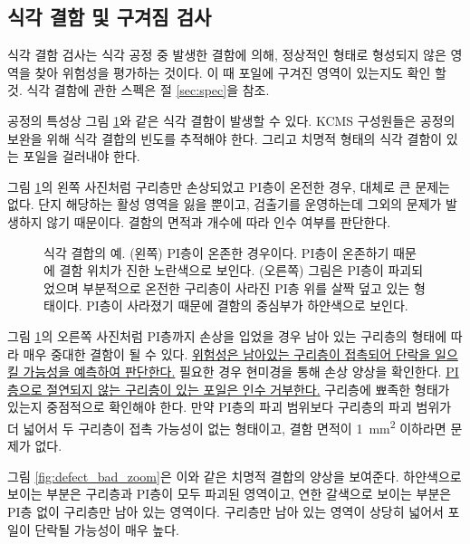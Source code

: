 \subsection{식각 결함 및 구겨짐 검사}
식각 결함 검사는 식각 공정 중 발생한 결함에 의해, 정상적인 형태로 형성되지 않은 영역을 찾아 위험성을 평가하는 것이다. 이 때 포일에 구겨진 영역이 있는지도 확인 할 것. 식각 결함에 관한 스펙은 절 \ref{sec:spec}을 참조.

공정의 특성상 그림 \ref{fig:example_defect}와 같은 식각 결함이 발생할 수 있다. KCMS 구성원들은 공정의 보완을 위해 식각 결합의 빈도를 추적해야 한다. 그리고 치명적 형태의 식각 결함이 있는 포일을 걸러내야 한다. 

그림 \ref{fig:example_defect}의 왼쪽 사진처럼 구리층만 손상되었고 PI층이 온전한 경우, 대체로 큰 문제는 없다. 단지 해당하는 활성 영역을 잃을 뿐이고, 검출기를 운영하는데 그외의 문제가 발생하지 않기 때문이다. 결함의 면적과 개수에 따라 인수 여부를 판단한다.

\begin{figure}[htb]
  \centering
  \caption[식각 결합의 예]{식각 결합의 예. (왼쪽) PI층이 온존한 경우이다. PI층이 온존하기 때문에 결함 위치가 진한 노란색으로 보인다. (오른쪽) 그림은 PI층이 파괴되었으며 부분적으로 온전한 구리층이 사라진 PI층 위를 살짝 덮고 있는 형태이다. PI층이 사라졌기 때문에 결함의 중심부가 하얀색으로 보인다.}
  \label{fig:example_defect}
\end{figure}

그림 \ref{fig:example_defect}의 오른쪽 사진처럼 PI층까지 손상을 입었을 경우 남아 있는 구리층의 형태에 따라 매우 중대한 결함이 될 수 있다. \uline{위험성은 남아있는 구리층이 접촉되어 단락을 일으킬 가능성을 예측하여 판단한다.} 필요한 경우 현미경을 통해 손상 양상을 확인한다. \uline{PI층으로 절연되지 않는 구리층이 있는 포일은 인수 거부한다.} 구리층에 뾰족한 형태가 있는지 중점적으로 확인해야 한다. 만약 PI층의 파괴 범위보다 구리층의 파괴 범위가 더 넓어서 두 구리층이 접촉 가능성이 없는 형태이고, 결함 면적이 \SI{1}{\milli\meter\squared} 이하라면 문제가 없다. 

그림 \ref{fig:defect_bad_zoom}은 이와 같은 치명적 결합의 양상을 보여준다. 하얀색으로 보이는 부분은 구리층과  PI층이 모두 파괴된 영역이고, 연한 갈색으로 보이는 부분은 PI층 없이 구리층만 남아 있는 영역이다. 구리층만 남아 있는 영역이 상당히 넓어서 포일이 단락될 가능성이 매우 높다.

